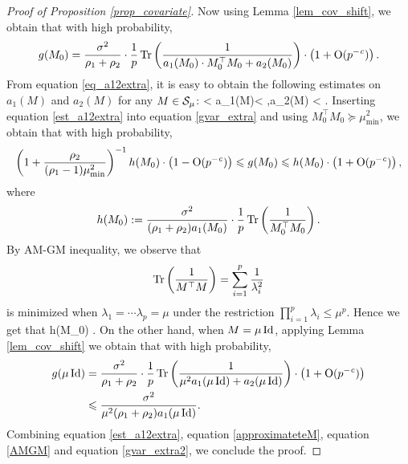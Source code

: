 \begin{proof}[Proof of Proposition \ref{prop_covariate}]
Now using Lemma \ref{lem_cov_shift}, we obtain that with high probability,
\begin{align}\label{gvar_extra}
g(M_0)= \frac{\sigma^2}{\rho_1+\rho_2}\cdot \frac1p\tr\left( \frac{1}{a_1(M_0)\cdot M_0^\top M_0 + a_2(M_0)}\right) \cdot \left(1 +\OO(p^{-\e})\right).
\end{align}
From equation \eqref{eq_a12extra}, it is easy to obtain the following estimates on $ a_1(M)$ and $a_2(M)$ for any $M\in \cal S_\mu$:
\be\label{est_a12extra}
 < a_1(M)<  ,\quad a_2(M) < .
\ee
Inserting equation \eqref{est_a12extra} into equation \eqref{gvar_extra} and using $ M_0^\top M_0\succeq \mu_{\min}^2$, we obtain that with high probability,
\begin{align}\label{approximateteM}
\left(1+\frac{\rho_2}{(\rho_1-1)\mu_{\min}^2}\right)^{-1}h(M_0) \cdot \left(1 - \OO(p^{-\e})\right) \le g(M_0) \le h(M_0) \cdot \left(1 +\OO(p^{-\e})\right),
\end{align}
where
$$h(M_0):=\frac{\sigma^2}{(\rho_1+\rho_2)a_1(M_0)}\cdot \frac1p\tr\left( \frac{1}{M_0^\top M_0}\right) .$$
%
By AM-GM inequality, we observe that 
$$\tr\left( \frac{1}{M^\top M}\right) = \sum_{i=1}^p\frac{1}{\lambda_i^2}$$
is minimized when $\lambda_1 = \cdots\lambda_p=\mu$ under the restriction $\prod_{i=1}^p\lambda_i\le \mu^p$. Hence we get that 
\be\label{AMGM} h(M_0) \le {}.\ee
On the other hand, when $M=\mu \id$, applying Lemma \ref{lem_cov_shift} we obtain that with high probability,
\begin{align}\label{gvar_extra2}
\begin{split}
g(\mu \id)&= \frac{\sigma^2}{\rho_1+\rho_2}\cdot \frac1p\tr\left( \frac{1}{\mu^2 a_1 (\mu\id) + a_2(\mu\id)}\right) \cdot \left(1 +\OO(p^{-\e})\right)\\
&\le \frac{\sigma^2}{\mu^2(\rho_1+\rho_2)a_1 (\mu\id)}.
\end{split}
\end{align}
Combining equation \eqref{est_a12extra}, equation \eqref{approximateteM}, equation \eqref{AMGM} and equation \eqref{gvar_extra2}, we conclude the proof.
\end{proof}

